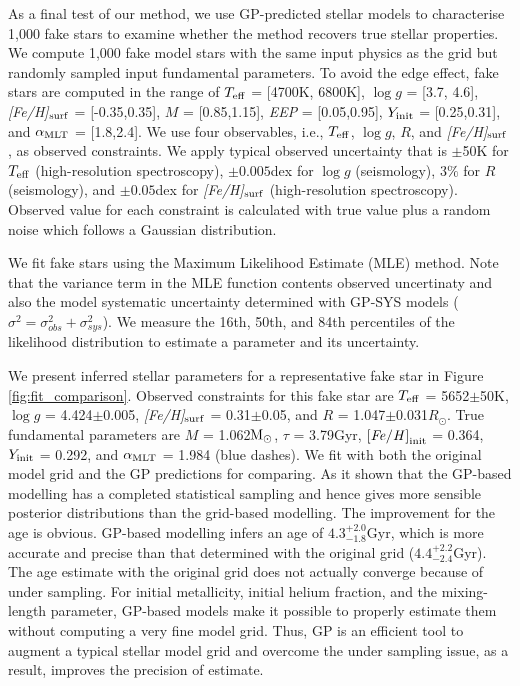 As a final test of our method, we use GP-predicted stellar models to characterise 1,000 fake stars to examine whether the method recovers true stellar properties. 
We compute 1,000 fake model stars with the same input physics as the grid but randomly sampled input fundamental parameters. To avoid the edge effect, fake stars are computed in the range of $T_{\rm eff}$ = [4700K, 6800K], $\log g$ = [3.7, 4.6], {\it [Fe/H]}$_{\rm surf}$ = [-0.35,0.35], $M$ = [0.85,1.15], {\it EEP} = [0.05,0.95], $Y_{\rm init}$ = [0.25,0.31], and $\alpha_{\rm MLT}$ = [1.8,2.4].
%
We use four observables, i.e., $T_{\rm eff}$, $\log g$, $R$, and {\it [Fe/H]}$_{\rm surf}$, as observed constraints. We apply typical observed uncertainty that is $\pm$50K for $T_{\rm eff}$ (high-resolution spectroscopy), $\pm0.005$dex for $\log g$ (seismology), $3\%$ for $R$ (seismology), and $\pm0.05$dex for {\it [Fe/H]}$_{\rm surf}$ (high-resolution spectroscopy). Observed value for each constraint is calculated with true value plus a random noise which follows a Gaussian distribution.  

We fit fake stars using the Maximum Likelihood Estimate (MLE) method. Note that the variance term in the MLE function contents observed uncertinaty and also the model systematic uncertainty determined with GP-SYS models ($\sigma^{2} = \sigma_{obs}^{2} +  \sigma_{sys}^{2} $). We measure the 16th, 50th, and 84th percentiles of the likelihood distribution to estimate a parameter and its uncertainty. 


We present inferred stellar parameters for a representative fake star in Figure \ref{fig:fit_comparison}. Observed constraints for this fake star are $T_{\rm eff}$ = 5652$\pm$50K, $\log g$ = 4.424$\pm$0.005, {\it [Fe/H]}$_{\rm surf}$ =  0.31$\pm$0.05, and $R$ =  1.047$\pm$0.031$R_{\odot}$. True fundamental parameters are $M$ = 1.062$\rm M_{\odot}$, $\tau$ = 3.79Gyr, $\rm {\it [Fe/H]}_{init}$ = 0.364, $Y_{\rm init}$ = 0.292, and $\alpha_{\rm MLT}$ = 1.984 (blue dashes). We fit with both the original model grid and the GP predictions for comparing.
%
As it shown that the GP-based modelling has a completed statistical sampling and hence gives more sensible posterior distributions than the grid-based modelling. The improvement for the age is obvious. GP-based modelling infers an age of $4.3^{+2.0}_{-1.8}$Gyr, which is more accurate and precise than that determined with the original grid ($4.4^{+2.2}_{-2.4}$Gyr). The age estimate with the original grid does not actually converge because of under sampling. For initial metallicity, initial helium fraction, and the mixing-length parameter, GP-based models make it possible to properly estimate them without computing a very fine model grid. Thus, GP is an efficient tool to augment a typical stellar model grid and overcome the under sampling issue, as a result, improves the precision of estimate.  

